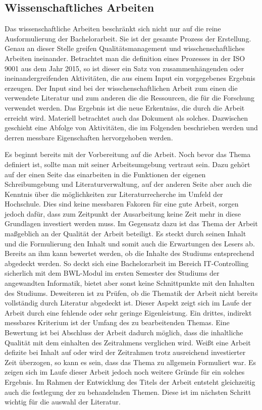 \subsection{Wissenschaftliches Arbeiten}
Das wissenschaftliche Arbeiten beschränkt sich nicht nur auf die reine Ausformulierung der Bachelorarbeit. Sie ist der gesamte Prozess der Erstellung. Genau an dieser Stelle greifen Qualitätsmanagement und wisschenschaftliches Arbeiten ineinander. Betrachtet man die definition eines Prozesses in der \ac{ISO} 9001 aus dem Jahr 2015, so ist dieser ein Satz von zusammenhängenden oder ineinandergreifenden Aktivitäten, die aus einem Input ein vorgegebenes Ergebnis erzeugen.\cite[Vgl.][]{iso9001:2015}
Der Input sind bei der wisschenschaftlichen Arbeit zum einen die verwendete Literatur und zum anderen die die Ressourcen, die für die Forschung verwendet werden. Das Ergebnis ist die neue Erkentniss, die durch die Arbeit erreicht wird. Materiell betrachtet auch das Dokument als solches. Dazwischen geschieht eine Abfolge von Aktivitäten, die im Folgenden beschrieben werden und derren messbare Eigenschaften hervorgehoben werden.

Es beginnt bereits mit der Vorbereitung auf die Arbeit. Noch bevor das Thema definiert ist, sollte man mit seiner Arbeitsumgebung vertraut sein. Dazu gehört auf der einen Seite das einarbeiten in die Funktionen der eigenen Schreibumgebung und Literaturverwaltung, auf der anderen Seite aber auch die Kenntnis über die möglichkeiten zur Literaturrecherche im Umfeld der Hochschule.\cite[Vgl.][S. 43]{Baensch:2013} Dies sind keine messbaren Fakoren für eine gute Arbeit, sorgen jedoch dafür, dass zum Zeitpunkt der Ausarbeitung keine Zeit mehr in diese Grundlagen investiert werden muss.
Im Gegensatz dazu ist das Thema der Arbeit maßgeblich an der Qualität der Arbeit beteiligt. Es steckt durch seinen Inhalt und die Formulierung den Inhalt und somit auch die Erwartungen des Lesers ab. Bereits an ihm kann bewertet werden, ob die Inhalte des Studiums entsprechend abgedeckt werden. So deckt sich eine Bachelorarbeit im Bereich IT-Controlling sicherlich mit dem BWL-Modul im ersten Semester des Studiums der angewandten Informatik, bietet aber sonst keine Schnittpunkte mit den Inhalten des Studiums. Deweiteren ist zu Prüfen, ob die Thematik der Arbeit nicht bereits vollständig durch Literatur abgedeckt ist. Dieser Aspekt zeigt sich im Laufe der Arbeit durch eine fehlende oder sehr geringe Eigenleistung. Ein drittes, indirekt messbares Kriterium ist der Umfang des zu bearbeitenden Themas. Eine Bewertung ist bei Abschluss der Arbeit dadurch möglich, dass die inhaltliche Qualität mit dem einhalten des Zeitrahmens verglichen wird. Weißt eine Arbeit defizite bei Inhalt auf oder wird der Zeitrahmen trotz ausreichend investierter Zeit überzogen, so kann es sein, dass das Thema zu allgemein Formuliert war.\cite[Vgl.][S. 46 f.]{Baensch:2013} Es zeigen sich im Laufe dieser Arbeit jedoch noch weitere Gründe für ein solches Ergebnis.
Im Rahmen der Entwicklung des Titels der Arbeit entsteht gleichzeitig auch die festlegung der zu behandelnden Themen. Diese ist im nächsten Schritt wichtig für die auswahl der Literatur.


